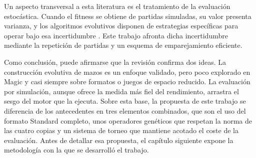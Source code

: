 Un aspecto transversal a esta literatura es el tratamiento de la evaluación estocástica. Cuando el fitness se obtiene de partidas simuladas, su valor presenta varianza, y los algoritmos evolutivos disponen de estrategias específicas para operar bajo esa incertidumbre \cite{jinbranke2005}. Este trabajo afronta dicha incertidumbre mediante la repetición de partidas y un esquema de emparejamiento eficiente.

Como conclusión, puede afirmarse que la revisión confirma dos ideas. La construcción evolutiva de mazos es un enfoque validado, pero poco explorado en Magic y casi siempre sobre formatos o juegos de espacio reducido. La evaluación por simulación, aunque ofrece la medida más fiel del rendimiento, arrastra el sesgo del motor que la ejecuta. Sobre esta base, la propuesta de este trabajo se diferencia de los antecedentes en tres elementos combinados, que son el uso del formato Standard completo, unos operadores genéticos que respetan la norma de las cuatro copias y un sistema de torneo que mantiene acotado el coste de la evaluación. Antes de detallar esa propuesta, el capítulo siguiente expone la metodología con la que se desarrolló el trabajo.
